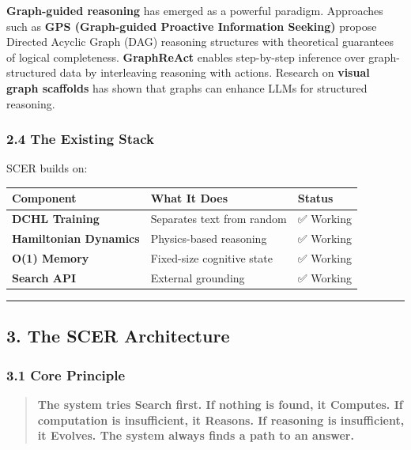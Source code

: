 \documentclass[
  11pt,
  a4paper,
]{article}
\begin{document}
\textbf{Graph-guided reasoning} has emerged as a powerful paradigm.
Approaches such as \textbf{GPS (Graph-guided Proactive Information
Seeking)} propose Directed Acyclic Graph (DAG) reasoning structures with
theoretical guarantees of logical completeness. \textbf{GraphReAct}
enables step-by-step inference over graph-structured data by
interleaving reasoning with actions. Research on \textbf{visual graph
scaffolds} has shown that graphs can enhance LLMs for structured
reasoning.

\subsubsection{2.4 The Existing Stack}\label{the-existing-stack}

SCER builds on:

\begin{longtable}[]{@{}lll@{}}
\toprule\noalign{}
Component & What It Does & Status \\
\midrule\noalign{}
\endhead
\bottomrule\noalign{}
\endlastfoot
\textbf{DCHL Training} & Separates text from random & ✅ Working \\
\textbf{Hamiltonian Dynamics} & Physics-based reasoning & ✅ Working \\
\textbf{O(1) Memory} & Fixed-size cognitive state & ✅ Working \\
\textbf{Search API} & External grounding & ✅ Working \\
\end{longtable}

\begin{center}\rule{0.5\linewidth}{0.5pt}\end{center}

\subsection{3. The SCER Architecture}\label{the-scer-architecture}

\subsubsection{3.1 Core Principle}\label{core-principle}

\begin{quote}
\textbf{The system tries Search first. If nothing is found, it Computes.
If computation is insufficient, it Reasons. If reasoning is
insufficient, it Evolves. The system always finds a path to an answer.}
\end{quote}
\end{document}
